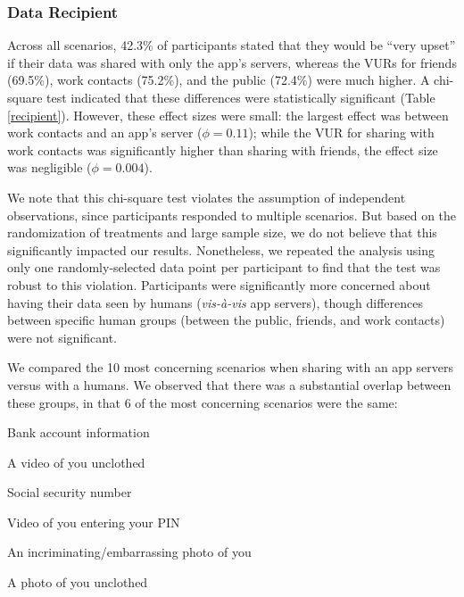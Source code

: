 \documentclass{acm_proc_article-sp}
\newenvironment{packed_enum}{
\begin{enumerate}
  \setlength{\itemsep}{1pt}
  \setlength{\parskip}{0pt}
  \setlength{\parsep}{0pt}
}{\end{enumerate}}
\begin{document}
\subsubsection{Data Recipient}
Across all scenarios, 42.3\% of participants stated that they would be ``very upset'' if their data was shared with only the app's servers, whereas the VURs for friends (69.5\%), work contacts (75.2\%), and the public (72.4\%) were much higher. A chi-square test indicated that these differences were statistically significant (Table \ref{recipient}). However, these effect sizes were small: the largest effect was between work contacts and an app's server ($\phi=0.11$); while the VUR for sharing with work contacts was significantly higher than sharing with friends, the effect size was negligible ($\phi=0.004$). 

We note that this chi-square test violates the assumption of independent observations, since participants responded to multiple scenarios. But based on the randomization of treatments and large sample size, we do not believe that this significantly impacted our results. Nonetheless, we repeated the analysis using only one randomly-selected data point per participant to find that the test was robust to this violation. Participants were significantly more concerned about having their data seen by humans ({\it vis-{\`a}-vis} app servers), though differences between specific human groups (between the public, friends, and work contacts) were not significant.


We compared the 10 most concerning scenarios when sharing with an app servers versus with a humans. We observed that there was a substantial overlap between these groups, in that 6 of the most concerning scenarios were the same: \\[-.8cm]

\begin{packed_enum}
\item Bank account information
\item A video of you unclothed
\item Social security number
\item Video of you entering your PIN
\item An incriminating/embarrassing photo of you
\item A photo of you unclothed \\[-.8cm]
\end{packed_enum}
\end{document}
